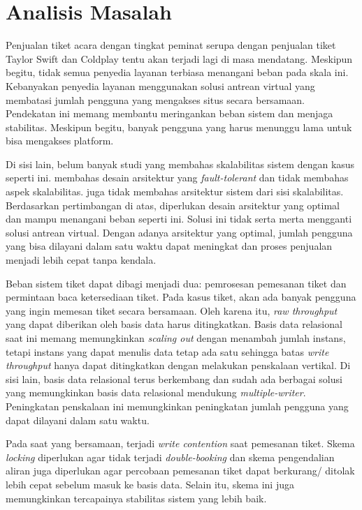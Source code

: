 
\section{Analisis Masalah}

Penjualan tiket acara dengan tingkat peminat serupa dengan penjualan tiket Taylor Swift dan Coldplay tentu akan terjadi lagi di masa mendatang. Meskipun begitu, tidak semua penyedia layanan terbiasa menangani beban pada skala ini. Kebanyakan penyedia layanan menggunakan solusi antrean virtual yang membatasi jumlah pengguna yang mengakses situs secara bersamaan. Pendekatan ini memang membantu meringankan beban sistem dan menjaga stabilitas. Meskipun begitu, banyak pengguna yang harus menunggu lama untuk bisa mengakses platform.

Di sisi lain, belum banyak studi yang membahas skalabilitas sistem dengan kasus seperti ini. \cite{microservicesEventDriven} membahas desain arsitektur yang \textit{fault-tolerant} dan tidak membahas aspek skalabilitas. \cite{backendForTicketing} juga tidak membahas arsitektur sistem dari sisi skalabilitas. Berdasarkan pertimbangan di atas, diperlukan desain arsitektur yang optimal dan mampu menangani beban seperti ini. Solusi ini tidak serta merta mengganti solusi antrean virtual. Dengan adanya arsitektur yang optimal, jumlah pengguna yang bisa dilayani dalam satu waktu dapat meningkat dan proses penjualan menjadi lebih cepat tanpa kendala.

Beban sistem tiket dapat dibagi menjadi dua: pemrosesan pemesanan tiket dan permintaan baca ketersediaan tiket. Pada kasus tiket, akan ada banyak pengguna yang ingin memesan tiket secara bersamaan. Oleh karena itu, \textit{raw throughput} yang dapat diberikan oleh basis data harus ditingkatkan. Basis data relasional saat ini memang memungkinkan \textit{scaling out} dengan menambah jumlah instans, tetapi instans yang dapat menulis data tetap ada satu sehingga batas \textit{write throughput} hanya dapat ditingkatkan dengan melakukan penskalaan vertikal. Di sisi lain, basis data relasional terus berkembang dan sudah ada berbagai solusi yang memungkinkan basis data relasional mendukung \textit{multiple-writer}. Peningkatan penskalaan ini memungkinkan peningkatan jumlah pengguna yang dapat dilayani dalam satu waktu.

Pada saat yang bersamaan, terjadi \textit{write contention} saat pemesanan tiket. Skema \textit{locking} diperlukan agar tidak terjadi \textit{double-booking} dan skema pengendalian aliran juga diperlukan agar percobaan pemesanan tiket dapat berkurang/ ditolak lebih cepat sebelum masuk ke basis data. Selain itu, skema ini juga memungkinkan tercapainya stabilitas sistem yang lebih baik.
